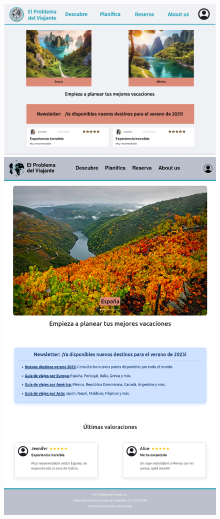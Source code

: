 \documentclass[11pt, a4paper]{book}
\begin{document}
	\begin{figure} [H]
		\centering
		\begin{minipage}[c]{0.45\textwidth}
			\centering
			\includegraphics[width=\textwidth]{mockup-principal.png}
		\end{minipage}
		\hspace{0.04\textwidth}
		\begin{minipage}[c]{0.45\textwidth}
			\centering
			\includegraphics[width=\textwidth]{full-1.png}

\end{minipage}
\end{figure}
\end{document}
